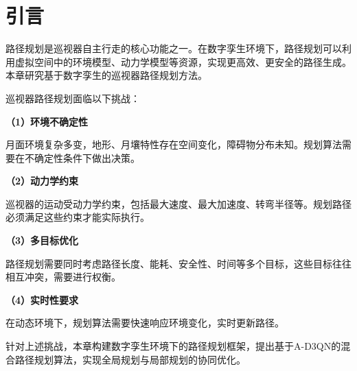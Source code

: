 \section{引言}
\label{sec:ch6_intro}

路径规划是巡视器自主行走的核心功能之一。在数字孪生环境下，路径规划可以利用虚拟空间中的环境模型、动力学模型等资源，实现更高效、更安全的路径生成。本章研究基于数字孪生的巡视器路径规划方法。

巡视器路径规划面临以下挑战：

\textbf{（1）环境不确定性}

月面环境复杂多变，地形、月壤特性存在空间变化，障碍物分布未知。规划算法需要在不确定性条件下做出决策。

\textbf{（2）动力学约束}

巡视器的运动受动力学约束，包括最大速度、最大加速度、转弯半径等。规划路径必须满足这些约束才能实际执行。

\textbf{（3）多目标优化}

路径规划需要同时考虑路径长度、能耗、安全性、时间等多个目标，这些目标往往相互冲突，需要进行权衡。

\textbf{（4）实时性要求}

在动态环境下，规划算法需要快速响应环境变化，实时更新路径。

针对上述挑战，本章构建数字孪生环境下的路径规划框架，提出基于A-D3QN的混合路径规划算法，实现全局规划与局部规划的协同优化。
